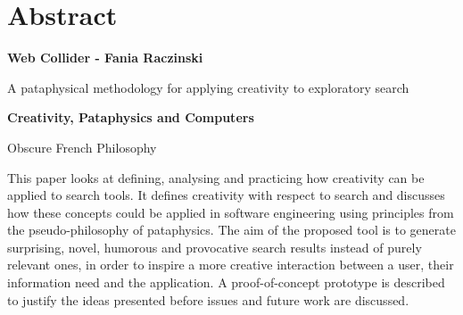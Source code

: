 
\pagestyle{empty}

\chapter{Abstract}
\label{abstract}

{\Large \textbf{Web Collider - Fania Raczinski}}

\vspace{0.5cm}

A pataphysical methodology for applying creativity to exploratory search

\vspace{1cm}

{\Large \textbf{Creativity, Pataphysics and Computers}}

Obscure French Philosophy

This paper looks at defining, analysing and practicing how creativity can be applied to search tools. It defines creativity with respect to search and discusses how these concepts could be applied in software engineering using principles from the pseudo-philosophy of pataphysics. The aim of the proposed tool is to generate surprising, novel, humorous and provocative search results instead of purely relevant ones, in order to inspire a more creative interaction between a user, their information need and the application. A proof-of-concept prototype is described to justify the ideas presented before issues and future work are discussed.

\clearpage
